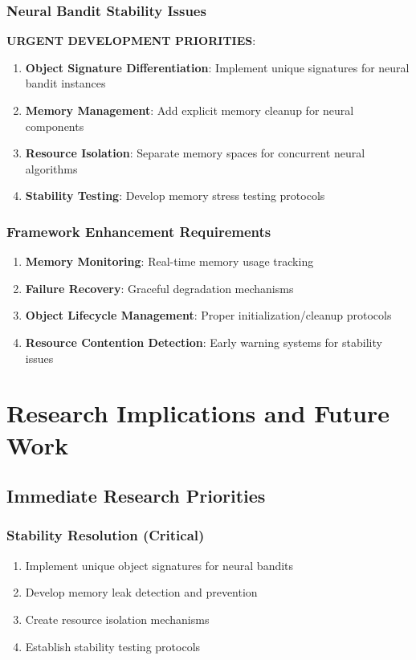 \documentclass[12pt,a4paper]{article}
\newcommand{\critical}[1]{\textcolor{criticalcolor}{\textbf{#1}}}
\begin{document}
\subsubsection{Neural Bandit Stability Issues}

\critical{URGENT DEVELOPMENT PRIORITIES}:
\begin{enumerate}
\item \textbf{Object Signature Differentiation}: Implement unique signatures for neural bandit instances
\item \textbf{Memory Management}: Add explicit memory cleanup for neural components
\item \textbf{Resource Isolation}: Separate memory spaces for concurrent neural algorithms
\item \textbf{Stability Testing}: Develop memory stress testing protocols
\end{enumerate}

\subsubsection{Framework Enhancement Requirements}

\begin{enumerate}
\item \textbf{Memory Monitoring}: Real-time memory usage tracking
\item \textbf{Failure Recovery}: Graceful degradation mechanisms
\item \textbf{Object Lifecycle Management}: Proper initialization/cleanup protocols
\item \textbf{Resource Contention Detection}: Early warning systems for stability issues
\end{enumerate}

\section{Research Implications and Future Work}

\subsection{Immediate Research Priorities}

\subsubsection{Stability Resolution (Critical)}
\begin{enumerate}
\item Implement unique object signatures for neural bandits
\item Develop memory leak detection and prevention
\item Create resource isolation mechanisms
\item Establish stability testing protocols
\end{enumerate}
\end{document}
